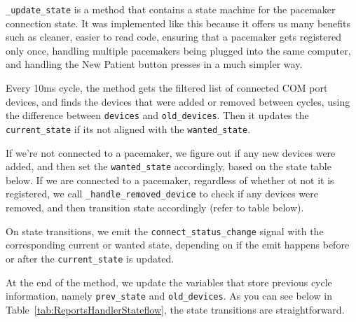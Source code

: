 \documentclass[12pt]{article}
\begin{document}
\verb|_update_state| is a method that contains a state machine for the pacemaker connection state.
It was implemented like this because it offers us many benefits such as cleaner, easier to read code, ensuring that a pacemaker gets registered only once, handling multiple pacemakers being plugged into the same computer, and handling the New Patient button presses in a much simpler way.

Every 10ms cycle, the method gets the filtered list of connected COM port devices, and finds the devices that were added or removed between cycles, using the difference between \verb|devices| and \verb|old_devices|.
Then it updates the \verb|current_state| if its not aligned with the \verb|wanted_state|.

If we're not connected to a pacemaker, we figure out if any new devices were added, and then set the \verb|wanted_state| accordingly, based on the state table below.
If we are connected to a pacemaker, regardless of whether ot not it is registered, we call \verb|_handle_removed_device| to check if any devices were removed, and then transition state accordingly (refer to table below).

On state transitions, we emit the \verb|connect_status_change| signal with the corresponding current or wanted state, depending on if the emit happens before or after the \verb|current_state| is updated.

At the end of the method, we update the variables that store previous cycle information, namely \verb|prev_state| and \verb|old_devices|.
As you can see below in Table~\ref{tab:ReportsHandlerStateflow}, the state transitions are straightforward.
\end{document}
